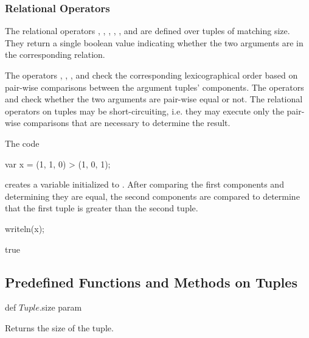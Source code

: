\subsubsection{Relational Operators}
\label{Tuple_Relational_Operators}


The relational operators \chpl{\>}, \chpl{\>\=}, \chpl{\<}, \chpl{\<\=},
\chpl{\=\=}, and \chpl{\!\=} are defined over tuples of matching size.
They return a single boolean value indicating whether the two
arguments are in the corresponding relation.

The operators \chpl{\>}, \chpl{\>\=}, \chpl{\<}, and \chpl{\<\=}
check the corresponding lexicographical order
based on pair-wise comparisons between the argument tuples' components.
The operators \chpl{\=\=} and \chpl{\!\=} check whether
the two arguments are pair-wise equal or not.
The relational operators on tuples may be short-circuiting, i.e.
they may execute only the pair-wise comparisons that are necessary
to determine the result.

\begin{example}
\begin{chapelpre}
\end{chapelpre}
The code
\begin{chapel}
var x = (1, 1, 0) > (1, 0, 1);
\end{chapel}
creates a variable initialized to .  After comparing the
first components and determining they are equal, the second components
are compared to determine that the first tuple is greater than the
second tuple.
\begin{chapelpost}
writeln(x);
\end{chapelpost}
\begin{chapeloutput}
true
\end{chapeloutput}
\end{example}

\subsection{Predefined Functions and Methods on Tuples}

\begin{protohead}
def $Tuple$.size param
\end{protohead}
\begin{protobody}
Returns the size of the tuple.
\end{protobody}

